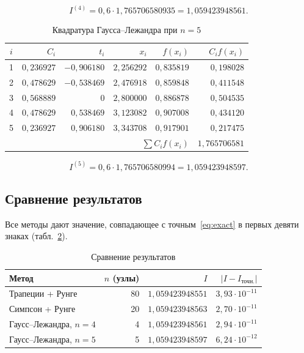\documentclass[14pt,a4paper]{extarticle}
\begin{document}
\begin{equation}
    I^{(4)}=0{,}6\cdot1{,}765706580935=1{,}059423948561 .
    \label{eq:gauss4-result}
\end{equation}

\begin{table}[H]
    \centering
    \caption{Квадратура Гаусса--Лежандра при $n=5$}
    \label{tab:gauss5}
    \small
    \begin{tabular}{crrrrr}
        \toprule
        $i$ & $C_i$ & $t_i$ & $x_i$ & $f(x_i)$ & $C_i f(x_i)$\\
        \midrule
        1 & $0{,}236927$ & $-0{,}906180$ & $2{,}256292$ & $0{,}835819$ & $0{,}198028$\\
        2 & $0{,}478629$ & $-0{,}538469$ & $2{,}476918$ & $0{,}859848$ & $0{,}411548$\\
        3 & $0{,}568889$ & $ 0$          & $2{,}800000$ & $0{,}886878$ & $0{,}504535$\\
        4 & $0{,}478629$ & $ 0{,}538469$ & $3{,}123082$ & $0{,}907008$ & $0{,}434120$\\
        5 & $0{,}236927$ & $ 0{,}906180$ & $3{,}343708$ & $0{,}917901$ & $0{,}217475$\\
        \midrule
        \multicolumn{5}{r}{$\sum C_i f(x_i)$} & $1{,}765706581$\\
        \bottomrule
    \end{tabular}
\end{table}

\begin{equation}
    I^{(5)}=0{,}6\cdot1{,}765706580994=1{,}059423948597 .
    \label{eq:gauss5-result}
\end{equation}

\subsection{Сравнение результатов}

Все методы дают значение, совпадающее с точным~\eqref{eq:exact}
в первых девяти знаках (табл.~\ref{tab:compare}).

\begin{table}[H]
    \centering
    \caption{Сравнение результатов}
    \label{tab:compare}
    \small
    \begin{tabular}{lrrr}
        \toprule
        Метод & $n$ (узлы) & $I$ & $|I-I_{\text{точн.}}|$\\
        \midrule
        Трапеции + Рунге & 80 & $1{,}059423948551$ & $3{,}93\cdot10^{-11}$\\
        Симпсон + Рунге  & 20 & $1{,}059423948563$ & $2{,}70\cdot10^{-11}$\\
        Гаусс--Лежандра, $n=4$ & 4  & $1{,}059423948561$ & $2{,}94\cdot10^{-11}$\\
        Гаусс--Лежандра, $n=5$ & 5  & $1{,}059423948597$ & $6{,}24\cdot10^{-12}$\\
        \bottomrule
    \end{tabular}
\end{table}
\end{document}
